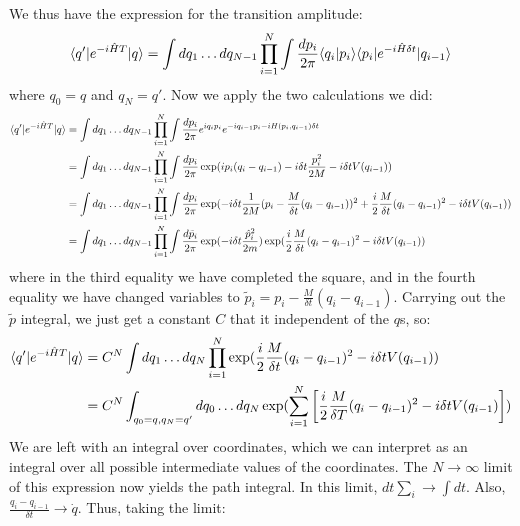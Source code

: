 We thus have the expression for the transition amplitude:
\begin{equation}
    \langle q' \rvert e^{-i\hat{H}T}\lvert q \rangle = \int dq_1 \ldots dq_{N-1}\prod_{i=1}^N \int \frac{dp_i}{2\pi}\langle q_i \lvert p_i \rangle\langle p_i \rvert e^{-i\hat{H}\delta t}\lvert q_{i-1} \rangle
\end{equation}
where $q_0 = q$ and $q_N = q'$. Now we apply the two calculations we did:
\begin{equation}
    \begin{split}
        \langle q' \rvert e^{-i\hat{H}T}\lvert q \rangle &= \int dq_1 \ldots dq_{N-1}\prod_{i=1}^N \int \frac{dp_i}{2\pi} e^{iq_ip_i}e^{-iq_{i-1}p_i - iH(p_i, q_{i-1})\delta t}
        \\ &= \int dq_1 \ldots dq_{N-1}\prod_{i=1}^N \int \frac{dp_i}{2\pi} \exp(ip_i(q_i - q_{i-1}) - i\delta t \frac{p_i^2}{2M} - i\delta t V(q_{i-1}))
        \\ &= \int dq_1 \ldots dq_{N-1}\prod_{i=1}^N \int \frac{dp_i}{2\pi} \exp(-i\delta t \frac{1}{2M}(p_i - \frac{M}{\delta t}(q_i - q_{i-1}))^2 + \frac{i}{2}\frac{M}{\delta t}(q_i - q_{i-1})^2 - i\delta t V(q_{i-1}))
        \\ &= \int dq_1 \ldots dq_{N-1}\prod_{i=1}^N \int \frac{d\tilde{p}_i}{2\pi} \exp(-i\delta t\frac{\hat{p}_i^2}{2m})\exp(\frac{i}{2}\frac{M}{\delta t}(q_i - q_{i-1})^2 - i\delta t V(q_{i-1}))
    \end{split}
\end{equation}
where in the third equality we have completed the square, and in the fourth equality we have changed variables to $\tilde{p}_i = p_i - \frac{M}{\delta t}(q_i - q_{i-1})$. Carrying out the $\tilde{p}$ integral, we just get a constant $C$ that it independent of the $q$s, so:
\begin{equation}
    \begin{split}
        \langle q' \rvert e^{-i\hat{H}T}\lvert q \rangle &= C^N\int dq_{1}\ldots dq_N \prod_{i=1}^N \exp(\frac{i}{2}\frac{M}{\delta t}(q_i - q_{i-1})^2 - i\delta t V(q_{i-1}))
        \\ &= C^N \int_{q_0=q, q_N = q'}dq_0 \ldots dq_N\exp(\sum_{i=1}^N\left[\frac{i}{2}\frac{M}{\delta T}(q_i - q_{i-1})^2 - i\delta tV(q_{i-1})\right])
    \end{split}
\end{equation}
We are left with an integral over coordinates, which we can interpret as an integral over all possible intermediate values of the coordinates. The $N \to \infty$ limit of this expression now yields the path integral. In this limit, $dt \sum_i \to \int dt$. Also, $\frac{q_{i} - q_{i-1}}{\delta t} \to \dot{q}$. Thus, taking the limit:
